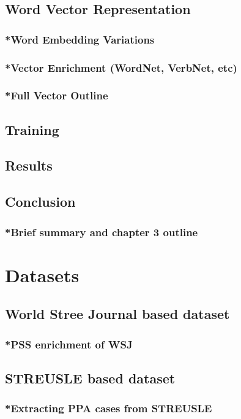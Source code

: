 \subsection{Word Vector Representation}
\subsubsection{*Word Embedding Variations}
\subsubsection{*Vector Enrichment (WordNet, VerbNet, etc)}
\subsubsection{*Full Vector Outline}
\subsection{Training}
\subsection{Results}
\subsection{Conclusion}
\subsubsection{*Brief summary and chapter 3 outline}
\pagebreak

\section{Datasets}
\subsection{World Stree Journal based dataset}
\subsubsection{*PSS enrichment of WSJ}
\subsection{STREUSLE based dataset}
\subsubsection{*Extracting PPA cases from STREUSLE}

